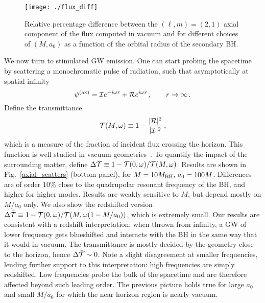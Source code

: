 \documentclass[twocolumn,preprintnumbers,nofootinbib,prd,superscriptaddress,aps]{revtex4-1}
\def\be{\begin{equation}}
\def\ee{\end{equation}}
\def\be{\begin{equation}}
\def\ee{\end{equation}}
\begin{document}
\begin{figure}[ht!]
\texttt{[image: ./flux\_diff]}
\caption{Relative percentage difference between the $(\ell,m)=(2,1)$  
axial component of the flux computed in vacuum and for different 
choices of $(M,a_0)$ as a function of the orbital radius of 
the secondary BH.
\label{axial_circular}}
\end{figure}
%
We now turn to stimulated GW emission. One can start probing the spacetime by scattering a monochromatic pulse of radiation, such that asymptotically at spatial infinity
%
\be
\psi^\textnormal{(ax)}={\cal I} e^{-i\omega r}+{\cal R} e^{i\omega r}\,,\qquad r\to \infty \, .\\
\ee
%
Define the transmittance 
%
\be
{\cal T}(M,\omega)\equiv 1-\frac{|{\cal R}|^2}{|{\cal I}|^2}\,,
\ee
%
which is a measure of the fraction of incident flux crossing the horizon. This function is well studied in vacuum geometries~\cite{Teukolsky:1974yv,Brito:2015oca}.
To quantify the impact of the surrounding matter, define $\Delta {\cal T}\equiv 1-{\cal T}(0,\omega)/{\cal T}(M,\omega)$. Results are shown in Fig.~\ref{axial_scatters} (bottom panel), for $M=10 M_{\rm BH},\, a_0=100M$. Differences are of order $10\%$ close to the quadrupolar resonant frequency of the BH, and higher for higher modes. Results are weakly sensitive to $M$, but depend mostly on $M/a_0$ only. We also show the redshifted version $\Delta \bar{\cal T}\equiv 1-{\cal T}(0,\omega)/{\cal T}(M,\omega(1-M/a_0))$, which is extremely small. Our results are consistent with a redshift interpretation:  when thrown from infinity, a GW of lower frequency gets blueshifted and interacts with the BH in the same way that it would in vacuum. The transmittance is mostly decided by the geometry close to the horizon, hence $\Delta \bar{\cal T}\sim 0$. Note a slight disagreement at smaller frequencies, lending further support to this interpretation: high frequencies are simply redshifted. Low frequencies probe the bulk of the spacetime and are therefore affected beyond such leading order. The previous picture holds true for large $a_0$ and small $M/a_0$ for which the near horizon region is nearly vacuum. 
\end{document}

